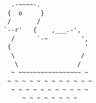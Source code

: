 \documentclass{article}
\begin{document}
  \vfill
  \centering
  \begin{BVerbatim}
    .-~~~~-.
   {  o     }
   /       /
  `--r'   {    ,___.-',
    /      `-~         ',
   {                    '
    \                  /
     \                /
    ~ ~~~~~~~~~~~~~~~~~ ~
   ~ ~ ~ ~ ~ ~ ~ ~ ~ ~ ~ ~
    ~ ~ ~ ~ ~ ~ ~ ~ ~ ~ ~
       ~ ~ ~ ~ ~ ~ ~ ~
  \end{BVerbatim}
  
  
\end{document}
